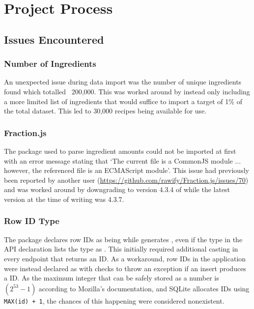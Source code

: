 \section{Project Process}

\subsection{Issues Encountered}

\subsubsection{Number of Ingredients}
An unexpected issue during data import was the number of unique ingredients found which totalled ~200,000. This was worked
around by instead only including a more limited list of ingredients that would suffice to import a target of 1\% of
the total dataset. This led to 30,000 recipes being available for use.

\subsubsection{Fraction.js}
The  package used to parse ingredient amounts could not be imported at first with an error message
stating that \enquote*{The current file is a CommonJS module ... however, the referenced file is an ECMAScript module}.
This issue had previously been reported by another user (\href{https://github.com/rawify/Fraction.js/issues/70}{https://github.com/rawify/Fraction.js/issues/70})
and was worked around by downgrading to version 4.3.4 of  while the latest version at the time
of writing was 4.3.7.

\subsubsection{Row ID Type}
The  package declares row IDs as being 
while  generates , even if the type in the API
declaration lists the type as . This initially required additional casting in every endpoint
that returns an ID. As a workaround, row IDs in the application were instead declared as 
with checks to throw an exception if an insert produces a  ID. As the maximum integer that can be safely stored as a number is
$(2^{53} - 1)$ according to Mozilla's documentation, and SQLite allocates IDs using \texttt{MAX(id) + 1},
the chances of this happening were considered nonexistent.

